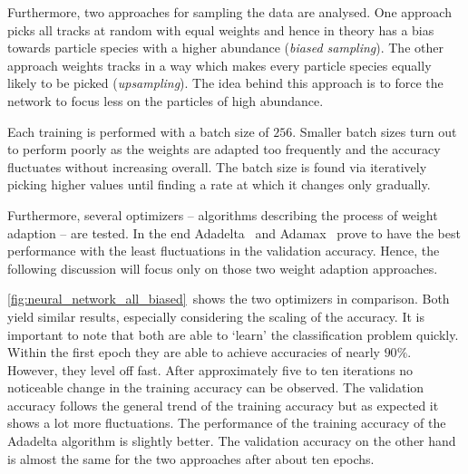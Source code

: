 Furthermore, two approaches for sampling the data are analysed. One approach picks all tracks at random with equal weights and hence in theory has a bias towards particle species with a higher abundance (\textit{biased sampling}). The other approach weights tracks in a way which makes every particle species equally likely to be picked (\textit{upsampling}). The idea behind this approach is to force the network to focus less on the particles of high abundance.

Each training is performed with a batch size of $256$. Smaller batch sizes turn out to perform poorly as the weights are adapted too frequently and the accuracy fluctuates without increasing overall. The batch size is found via iteratively picking higher values until finding a rate at which it changes only gradually.

Furthermore, several optimizers -- algorithms describing the process of weight adaption -- are tested. In the end Adadelta~\cite{DBLP:journals/corr/abs-1212-5701} and Adamax~\cite{DBLP:journals/corr/KingmaB14} prove to have the best performance with the least fluctuations in the validation accuracy. Hence, the following discussion will focus only on those two weight adaption approaches.

\autoref{fig:neural_network_all_biased}~shows the two optimizers in comparison. Both yield similar results, especially considering the scaling of the accuracy. It is important to note that both are able to `learn' the classification problem quickly. Within the first epoch they are able to achieve accuracies of nearly $90\%$. However, they level off fast. After approximately five to ten iterations no noticeable change in the training accuracy can be observed. The validation accuracy follows the general trend of the training accuracy but as expected it shows a lot more fluctuations. The performance of the training accuracy of the Adadelta algorithm is slightly better. The validation accuracy on the other hand is almost the same for the two approaches after about ten epochs.

